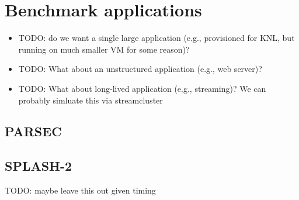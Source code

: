 \section{Benchmark applications}

\begin{itemize}
  \item TODO: do we want a single large application (e.g., provisioned for KNL, but running on much smaller VM for some reason)?
  \item TODO: What about an unstructured application (e.g., web server)?
  \item TODO: What about long-lived application (e.g., streaming)? We can probably simluate this via streamcluster
\end{itemize}

\subsection{PARSEC}

\subsection{SPLASH-2}
TODO: maybe leave this out given timing
